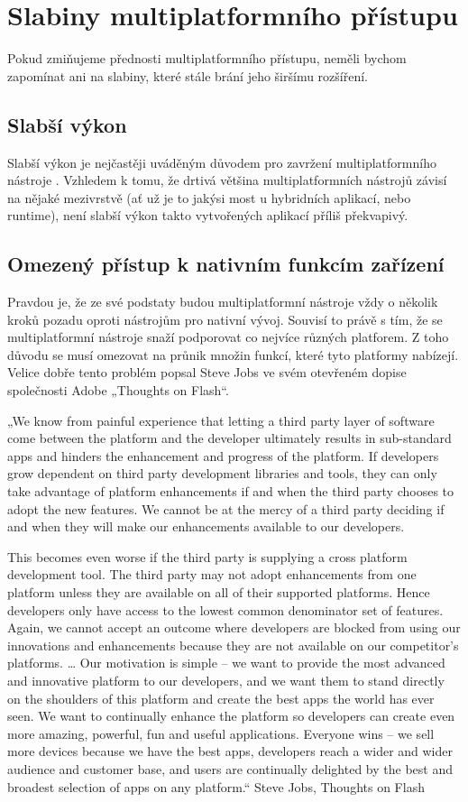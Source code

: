 \section{Slabiny multiplatformního přístupu}
Pokud zmiňujeme přednosti multiplatformního přístupu, neměli bychom zapomínat ani na slabiny, které stále brání jeho širšímu rozšíření.

\subsection{Slabší výkon}
Slabší výkon je nejčastěji uváděným důvodem pro zavržení multiplatformního nástroje \cite{visionmobile_survey}. Vzhledem k tomu, že drtivá většina multiplatformních nástrojů závisí na nějaké mezivrstvě (ať už je to jakýsi most u hybridních aplikací, nebo runtime), není slabší výkon takto vytvořených aplikací příliš překvapivý.

\subsection{Omezený přístup k nativním funkcím zařízení}
Pravdou je, že ze své podstaty budou multiplatformní nástroje vždy o několik kroků pozadu oproti nástrojům pro nativní vývoj. Souvisí to právě s tím, že se multiplatformní nástroje snaží podporovat co nejvíce různých platforem. Z toho důvodu se musí omezovat na průnik množin funkcí, které tyto platformy nabízejí. Velice dobře tento problém popsal Steve Jobs ve svém otevřeném dopise společnosti Adobe „Thoughts on Flash“.

„We know from painful experience that letting a third party layer of software come between the platform and the developer ultimately results in sub-standard apps and hinders the enhancement and progress of the platform. If developers grow dependent on third party development libraries and tools, they can only take advantage of platform enhancements if and when the third party chooses to adopt the new features. We cannot be at the mercy of a third party deciding if and when they will make our enhancements available to our developers.

This becomes even worse if the third party is supplying a cross platform development tool. The third party may not adopt enhancements from one platform unless they are available on all of their supported platforms. Hence developers only have access to the lowest common denominator set of features. Again, we cannot accept an outcome where developers are blocked from using our innovations and enhancements because they are not available on our competitor’s platforms.
…
Our motivation is simple – we want to provide the most advanced and innovative platform to our developers, and we want them to stand directly on the shoulders of this platform and create the best apps the world has ever seen. We want to continually enhance the platform so developers can create even more amazing, powerful, fun and useful applications. Everyone wins – we sell more devices because we have the best apps, developers reach a wider and wider audience and customer base, and users are continually delighted by the best and broadest selection of apps on any platform.“ Steve Jobs, Thoughts on Flash \cite{thoughts_on_flash}

